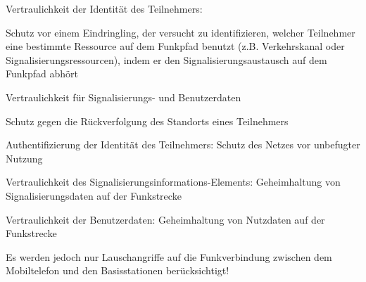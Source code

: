 \documentclass[a4paper]{article}
\begin{document}
\begin{multicols}{3}
\begin{itemize*}
\begin{itemize*}
                  \item Vertraulichkeit der Identität des Teilnehmers:
                  \begin{itemize*}
                        \item Schutz vor einem Eindringling, der versucht zu identifizieren, welcher Teilnehmer eine bestimmte Ressource auf dem Funkpfad benutzt (z.B. Verkehrskanal oder Signalisierungsressourcen), indem er den Signalisierungsaustausch auf dem Funkpfad abhört
                        \item Vertraulichkeit für Signalisierungs- und Benutzerdaten
                        \item Schutz gegen die Rückverfolgung des Standorts eines Teilnehmers
                  \end{itemize*}
                  \item Authentifizierung der Identität des Teilnehmers: Schutz des Netzes vor unbefugter Nutzung
                  \item Vertraulichkeit des Signalisierungsinformations-Elements: Geheimhaltung von Signalisierungsdaten auf der Funkstrecke
                  \item Vertraulichkeit der Benutzerdaten: Geheimhaltung von Nutzdaten auf der Funkstrecke
                  \item Es werden jedoch nur Lauschangriffe auf die Funkverbindung zwischen dem Mobiltelefon und den Basisstationen berücksichtigt!
            \end{itemize*}
      \end{itemize*}






\end{multicols}
\end{document}
